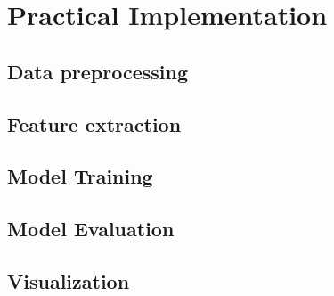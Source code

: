 \chapter{Practical Implementation}

\section{Data preprocessing}
\section{Feature extraction}
\section{Model Training}
\section{Model Evaluation}
\section{Visualization}